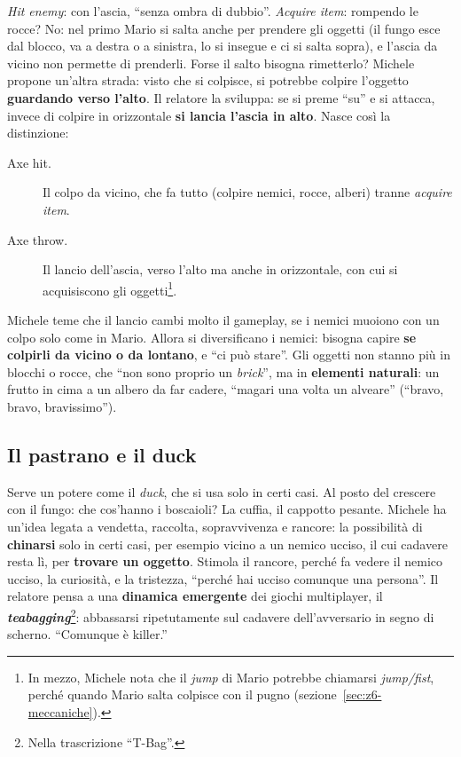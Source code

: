 \emph{Hit enemy}: con l'ascia, ``senza ombra di dubbio''. \emph{Acquire item}:
rompendo le rocce? No: nel primo Mario si salta anche per prendere gli oggetti
(il fungo esce dal blocco, va a destra o a sinistra, lo si insegue e ci si salta
sopra), e l'ascia da vicino non permette di prenderli. Forse il salto bisogna
rimetterlo? Michele propone un'altra strada: visto che si colpisce, si potrebbe
colpire l'oggetto \textbf{guardando verso l'alto}. Il relatore la sviluppa: se si
preme ``su'' e si attacca, invece di colpire in orizzontale \textbf{si lancia
l'ascia in alto}. Nasce così la distinzione:
\begin{description}
  \item[Axe hit.] Il colpo da vicino, che fa tutto (colpire nemici, rocce,
        alberi) tranne \emph{acquire item}.
  \item[Axe throw.] Il lancio dell'ascia, verso l'alto ma anche in orizzontale,
        con cui si acquisiscono gli oggetti\footnote{In mezzo, Michele nota che il
        \emph{jump} di Mario potrebbe chiamarsi \emph{jump/fist}, perché quando
        Mario salta colpisce con il pugno (sezione~\ref{sec:z6-meccaniche}).}.
\end{description}
Michele teme che il lancio cambi molto il gameplay, se i nemici muoiono con un colpo
solo come in Mario. Allora si diversificano i nemici: bisogna capire \textbf{se
colpirli da vicino o da lontano}, e ``ci può stare''. Gli oggetti non stanno più in
blocchi o rocce, che ``non sono proprio un \emph{brick}'', ma in \textbf{elementi
naturali}: un frutto in cima a un albero da far cadere, ``magari una volta un
alveare'' (``bravo, bravo, bravissimo'').

\subsection{Il pastrano e il duck}

Serve un potere come il \emph{duck}, che si usa solo in certi casi. Al posto del
crescere con il fungo: che cos'hanno i boscaioli? La cuffia, il cappotto pesante.
Michele ha un'idea legata a vendetta, raccolta, sopravvivenza e rancore: la
possibilità di \textbf{chinarsi} solo in certi casi, per esempio vicino a un
nemico ucciso, il cui cadavere resta lì, per \textbf{trovare un oggetto}. Stimola il
rancore, perché fa vedere il nemico ucciso, la curiosità, e la tristezza, ``perché
hai ucciso comunque una persona''. Il relatore pensa a una \textbf{dinamica
emergente} dei giochi multiplayer, il \textbf{\emph{teabagging}}\footnote{Nella
trascrizione ``T-Bag''.}: abbassarsi ripetutamente sul cadavere dell'avversario in
segno di scherno. ``Comunque è killer.''


